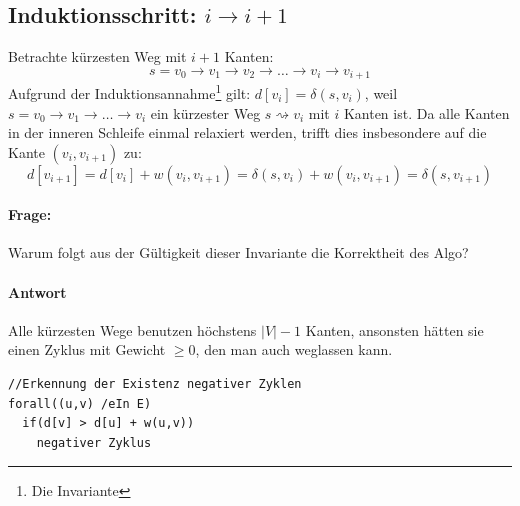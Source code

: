 \subsection{Induktionsschritt:  $i\rightarrow i+1$}
Betrachte kürzesten Weg mit $i+1$ Kanten:
\[ s=v_0\rightarrow v_1\rightarrow v_2\rightarrow\ldots\rightarrow v_i\rightarrow v_{i+1} \]
Aufgrund der Induktionsannahme\footnote{Die Invariante} gilt: $d[v_i] = \delta(s,v_i)$, weil $s=v_0\rightarrow v_1\rightarrow\ldots\rightarrow v_i$ ein kürzester Weg $s\rightsquigarrow v_i$ mit $i$ Kanten ist.
Da alle Kanten in der inneren Schleife einmal relaxiert werden, trifft dies insbesondere auf die Kante $(v_i, v_{i+1})$ zu:
\[ d[v_{i+1}] = d[v_i] + w(v_i, v_{i+1}) = \delta(s, v_i) + w(v_i, v_{i+1}) = \delta(s,v_{i+1}) \]
\paragraph{Frage:}
Warum folgt aus der Gültigkeit dieser Invariante die Korrektheit des Algo?
\paragraph{Antwort}
Alle kürzesten Wege benutzen höchstens $|V|-1$ Kanten, ansonsten hätten sie einen Zyklus mit Gewicht $\geq 0$, den man auch weglassen kann.
\begin{lstlisting}
//Erkennung der Existenz negativer Zyklen
forall((u,v) /eIn E)
  if(d[v] > d[u] + w(u,v))
    negativer Zyklus
\end{lstlisting}